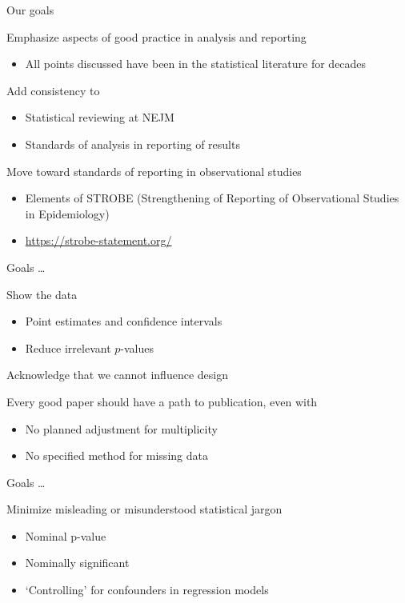 \documentclass[ignorenonframetext,]{beamer}
\providecommand{\tightlist}{%
  \setlength{\itemsep}{0pt}\setlength{\parskip}{0pt}}
\begin{document}
\begin{frame}{Our goals}
\protect\hypertarget{our-goals}{}

Emphasize aspects of good practice in analysis and reporting

\begin{itemize}
\tightlist
\item
  All points discussed have been in the statistical literature for
  decades
\end{itemize}

Add consistency to

\begin{itemize}
\item
  Statistical reviewing at NEJM
\item
  Standards of analysis in reporting of results
\end{itemize}

Move toward standards of reporting in observational studies

\begin{itemize}
\item
  Elements of STROBE (Strengthening of Reporting of Observational
  Studies in Epidemiology)
\item
  \url{https://strobe-statement.org/}
\end{itemize}

\end{frame}

\begin{frame}{Goals \ldots}
\protect\hypertarget{goals}{}

Show the data

\begin{itemize}
\item
  Point estimates and confidence intervals
\item
  Reduce irrelevant \(p\)-values
\end{itemize}

Acknowledge that we cannot influence design

Every good paper should have a path to publication, even with

\begin{itemize}
\item
  No planned adjustment for multiplicity
\item
  No specified method for missing data
\end{itemize}

\end{frame}

\begin{frame}{Goals \ldots}
\protect\hypertarget{goals-1}{}

Minimize misleading or misunderstood statistical jargon

\begin{itemize}
\item
  Nominal p-value
\item
  Nominally significant
\item
  `Controlling' for confounders in regression models
\end{itemize}

\end{frame}
\end{document}
